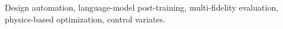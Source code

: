 \documentclass[journal,10pt]{IEEEtran}
\begin{document}
\par
\begin{IEEEkeywords}
Design automation, language-model post-training, multi-fidelity evaluation, physics-based optimization, control variates.
\end{IEEEkeywords}








\end{document}

